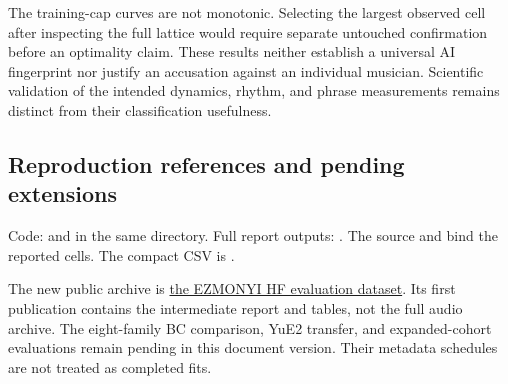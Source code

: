 The training-cap curves are not monotonic. Selecting the largest observed cell after inspecting the full lattice would require separate untouched confirmation before an optimality claim. These results neither establish a universal AI fingerprint nor justify an accusation against an individual musician. Scientific validation of the intended dynamics, rhythm, and phrase measurements remains distinct from their classification usefulness.

\subsection{Reproduction references and pending extensions}

Code:  and  in the same directory. Full report outputs: . The source  and  bind the reported cells. The compact CSV is .

The new public archive is \href{https://huggingface.co/datasets/EZMONYI/music-ai-human-test-audio}{the EZMONYI HF evaluation dataset}. Its first publication contains the intermediate report and tables, not the full audio archive. The eight-family BC comparison, YuE2 transfer, and expanded-cohort evaluations remain pending in this document version. Their metadata schedules are not treated as completed fits.
